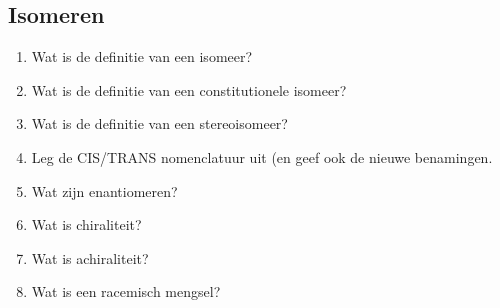 \documentclass[a4paper,12pt]{article}
\begin{document}
    \subsection*{Isomeren}
    \begin{enumerate}
	    \item Wat is de definitie van een isomeer?
	    \item Wat is de definitie van een constitutionele isomeer?
	    \item Wat is de definitie van een stereoisomeer?
	    \item Leg de CIS/TRANS nomenclatuur uit (en geef ook de nieuwe benamingen.
	    \item Wat zijn enantiomeren?
	    \item Wat is chiraliteit?
	    \item Wat is achiraliteit?
	    \item Wat is een racemisch mengsel?
    \end{enumerate}
\end{document}
